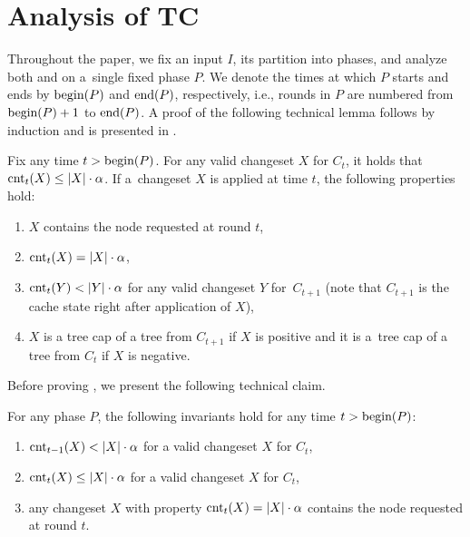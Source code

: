 



\section{Analysis of TC}
\label{sec:analysis}

Throughout the paper, we fix an input $I$, its partition into phases, and
analyze both \ALGTC and \OPT on a~single fixed phase $P$. We denote the times at
which $P$ starts and ends by $\textrm{begin}(P)$ and $\textrm{end}(P)$, respectively, i.e., rounds in
$P$ are numbered from $\textrm{begin}(P)+1$ to $\textrm{end}(P)$. A proof of the following technical
lemma follows by induction and is presented in 
.


\begin{lemma}
\label{lem:no_over-requested_changesets}
Fix any time $t > \textrm{begin}(P)$. For any valid changeset $X$ for $C_t$, it holds that
$\textrm{cnt}_t(X) \leq |X| \cdot \alpha$. If a~changeset $X$ is applied at time $t$,
the following properties hold:
\begin{enumerate}
\item $X$ contains the node requested at round $t$, 
\label{lemit:1}
\item $\textrm{cnt}_t(X) = |X| \cdot \alpha$, 
\label{lemit:2}
\item $\textrm{cnt}_t(Y) < |Y| \cdot \alpha$ for any valid changeset $Y$ for~$C_{t+1}$
(note that $C_{t+1}$ is the cache state right after application of $X$),
\label{lemit:3}
\item $X$ is a tree cap of a tree from $C_{t+1}$ if
$X$ is positive and it is a~tree cap of a tree from $C_t$ if $X$ is
negative.
\label{lemit:4}
\end{enumerate}
\end{lemma}
Before proving , 
we present the following technical claim.


\begin{claim}
\label{cla:inductive_properties}
For any phase $P$, the following invariants hold for any time $t > \textrm{begin}(P)$:
\begin{enumerate}
\item $\textrm{cnt}_{t-1}(X) < |X| \cdot \alpha$ for a valid changeset $X$ for $C_t$,\hspace{-1em}
\label{item:prop1}
\item $\textrm{cnt}_t(X) \leq |X| \cdot \alpha$ for a valid changeset $X$ for $C_t$,
\label{item:prop2}
\item any changeset $X$ with property $\textrm{cnt}_t(X) = |X| \cdot \alpha$ contains 
the node requested at round $t$.
\label{item:propmid}
\end{enumerate}
\end{claim}

